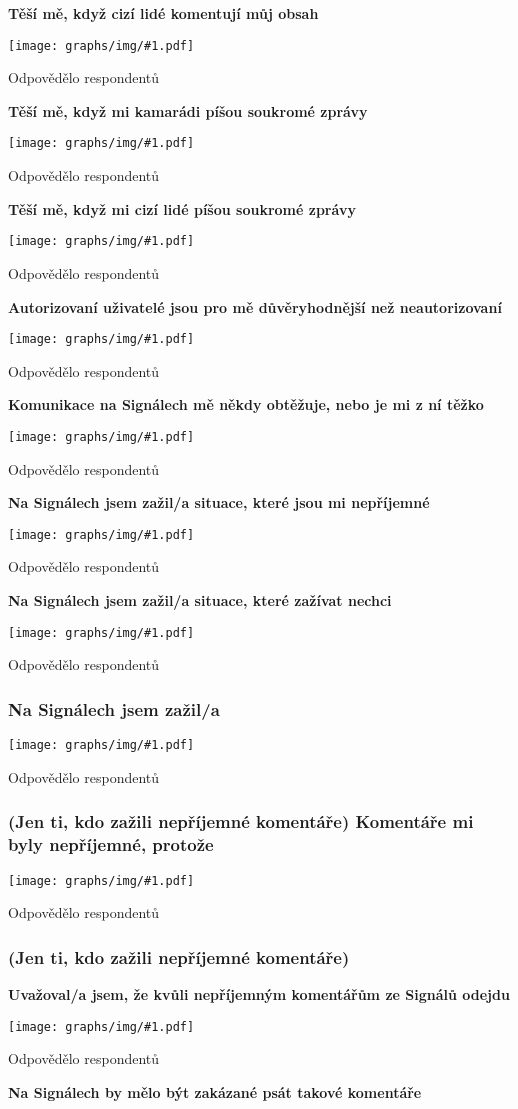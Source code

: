 \documentclass[12pt, a4paper, twoside]{article}
\newcommand{\answercount}[1]{Odpovědělo  respondentů}
\newcommand{\includegraph}[1]{
  \texttt{[image: graphs/img/\#1.pdf]}

  \answercount{#1}
}
\begin{document}
\textbf{Těší mě, když cizí lidé komentují můj obsah}

\includegraph{ostatni_tesi_me_komentar_cizi}

\textbf{Těší mě, když mi kamarádi píšou soukromé zprávy}

\includegraph{ostatni_tesi_me_zprava_kamaradi}

\textbf{Těší mě, když mi cizí lidé píšou soukromé zprávy}

\includegraph{ostatni_tesi_me_zprava_cizi}

\textbf{Autorizovaní uživatelé jsou pro mě důvěryhodnější než neautorizovaní}

\includegraph{ostatni_autorizovani_duveryhodnejsi}

\textbf{Komunikace na Signálech mě někdy obtěžuje, nebo je mi z ní těžko}

\includegraph{ostatni_neprijemne_komunikace_obtezuje}

\textbf{Na Signálech jsem zažil/a situace, které jsou mi nepříjemné}

\includegraph{ostatni_neprijemne_neprijemne_situace}

\textbf{Na Signálech jsem zažil/a situace, které zažívat nechci}

\includegraph{ostatni_neprijemne_zazivat_nechci}

\subsubsection{Na Signálech jsem zažil/a}

\includegraph{neprijemne_co}

\subsubsection{(Jen ti, kdo zažili nepříjemné komentáře) Komentáře mi byly nepříjemné, protože}

\includegraph{neprijemne_komentare_protoze}

\subsubsection{(Jen ti, kdo zažili nepříjemné komentáře)}

\textbf{Uvažoval/a jsem, že kvůli nepříjemným komentářům ze Signálů odejdu}

\includegraph{neprijemne_komentare_zvazoval_odchod}

\textbf{Na Signálech by mělo být zakázané psát takové komentáře}
\end{document}

